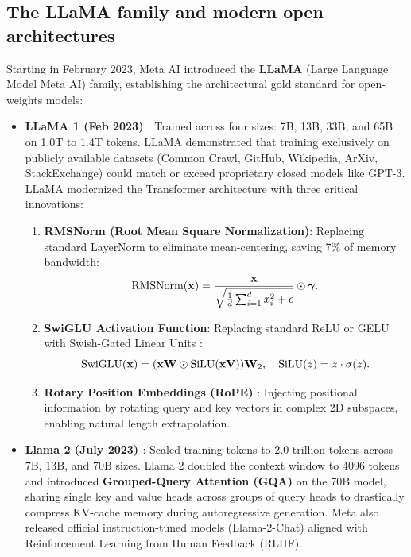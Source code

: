 \documentclass[../../main.tex]{subfiles}
\begin{document}
\subsection{The LLaMA family and modern open architectures}
\label{subsec:open_models_llama}

Starting in February 2023, Meta AI introduced the \textbf{LLaMA} (Large Language Model Meta AI) family, establishing the architectural gold standard for open-weights models:
\begin{itemize}
    \item \textbf{LLaMA 1 (Feb 2023) \cite{touvron2023llama}}:
    Trained across four sizes: 7B, 13B, 33B, and 65B on 1.0T to 1.4T tokens. LLaMA demonstrated that training exclusively on publicly available datasets (Common Crawl, GitHub, Wikipedia, ArXiv, StackExchange) could match or exceed proprietary closed models like GPT-3.
    LLaMA modernized the Transformer architecture with three critical innovations:
    \begin{enumerate}
        \item \textbf{RMSNorm (Root Mean Square Normalization)}: Replacing standard LayerNorm to eliminate mean-centering, saving 7\% of memory bandwidth:
        \begin{equation}
        \operatorname{\mathrm{RMSNorm}}(\mathbf{x}) = \frac{\mathbf{x}}{\sqrt{\frac{1}{d} \sum_{i=1}^d x_i^2 + \epsilon}} \odot \bm{\gamma}.
        \end{equation}
        \item \textbf{SwiGLU Activation Function}: Replacing standard ReLU or GELU with Swish-Gated Linear Units \cite{shazeer2020glu}:
        \begin{equation}
        \operatorname{\mathrm{SwiGLU}}(\mathbf{x}) = (\mathbf{x} \mathbf{W} \odot \operatorname{\mathrm{SiLU}}(\mathbf{x} \mathbf{V})) \mathbf{W}_2, \quad \operatorname{\mathrm{SiLU}}(z) = z \cdot \sigma(z).
        \end{equation}
        \item \textbf{Rotary Position Embeddings (RoPE)} \cite{su2024roformer}: Injecting positional information by rotating query and key vectors in complex 2D subspaces, enabling natural length extrapolation.
    \end{enumerate}

    \item \textbf{Llama 2 (July 2023) \cite{touvron2023llama2}}:
    Scaled training tokens to 2.0 trillion tokens across 7B, 13B, and 70B sizes. Llama 2 doubled the context window to 4096 tokens and introduced \textbf{Grouped-Query Attention (GQA)} on the 70B model, sharing single key and value heads across groups of query heads to drastically compress KV-cache memory during autoregressive generation. Meta also released official instruction-tuned models (Llama-2-Chat) aligned with Reinforcement Learning from Human Feedback (RLHF).
    

\end{itemize}
\end{document}
